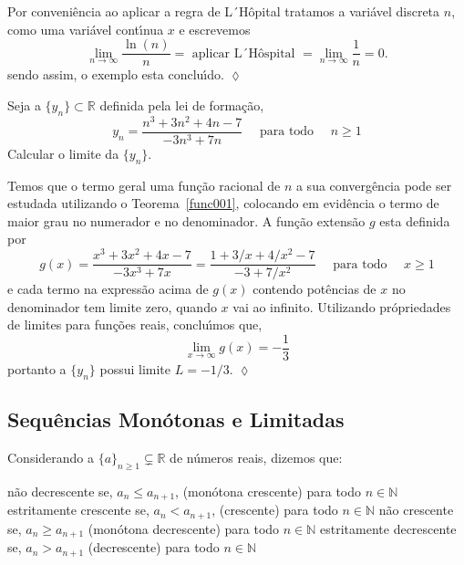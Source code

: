Por conveni\^{e}ncia ao aplicar a regra de L´H\^{o}pital tratamos a vari\'{a}vel discreta $n$, como uma vari\'{a}vel cont\'{\i}nua $x$ e escrevemos
\begin{equation*}
    \lim_{n\to \infty}\frac{\ln(n)}{n}=\text{ aplicar L´H\^{o}spital }=\lim_{n\to \infty}\frac{1}{n}=0.
\end{equation*}
sendo assim, o exemplo esta conclu\'{\i}do. \hfill \(\lozenge\)

\begin{exer}
Seja a \seq $\{y_n\}\subset \mathbb{R}$ definida pela lei de forma\c{c}\~{a}o,
\begin{equation*}
    y_n=\frac{n^3+3n^2+4n-7}{-3n^3+7n}\quad \text{ para todo }\quad n\geq 1
\end{equation*}
Calcular o limite da \seq $\{y_n\}$.
\end{exer}

\solo Temos que o termo geral uma fun\c{c}\~{a}o racional de $n$ a sua converg\^{e}ncia pode ser estudada utilizando o Teorema~\ref{func001}, colocando em evid\^{e}ncia o termo de maior grau no numerador e no denominador. A fun\c{c}\~{a}o extens\~{a}o $g$ esta definida por
\begin{equation*}
    g(x)=\frac{x^3+3x^2+4x-7}{-3x^3+7x}=\frac{1+3/x+4/x^2-7}{-3+7/x^2}\quad \text{ para todo }\quad x\geq 1
\end{equation*}
e cada termo na express\~{a}o acima de $g(x)$ contendo pot\^{e}ncias de $x$ no denominador tem limite zero, quando $x$ vai ao infinito. Utilizando pr\'{o}priedades de limites para fun\c{c}\~{o}es reais, conclu\'{\i}mos que,
\begin{equation*}
    \lim_{x\to\infty}g(x)=-\frac{1}{3}
\end{equation*}
portanto a \seq $\{y_n\}$ possui limite $L=-1/3$. \hfill \(\lozenge\)

\subsection{Sequ\^{e}ncias Mon\'{o}tonas e Limitadas}
\begin{defi}
Considerando a \seq $\{a\}_{n\geq 1}\subsetneq \mathbb{R}$ de n\'{u}meros reais, dizemos que:
\begin{tasks}[style=itemize,item-indent=3em,label-width=4ex]
\task   n\~{a}o decrescente se, $a_n\leq a_{n+1}$, (mon\'{o}tona crescente) para todo $n\in \mathbb{N}$
\task[+]  estritamente crescente se, $a_n< a_{n+1}$, (crescente) para todo  $n\in \mathbb{N}$
\task[+] n\~{a}o crescente se, $a_n\geq a_{n+1}$ (mon\'{o}tona decrescente) para todo $n\in \mathbb{N}$
\task   estritamente decrescente se, $a_n> a_{n+1}$ (decrescente) para todo $n\in \mathbb{N}$
\end{tasks}
\end{defi}

